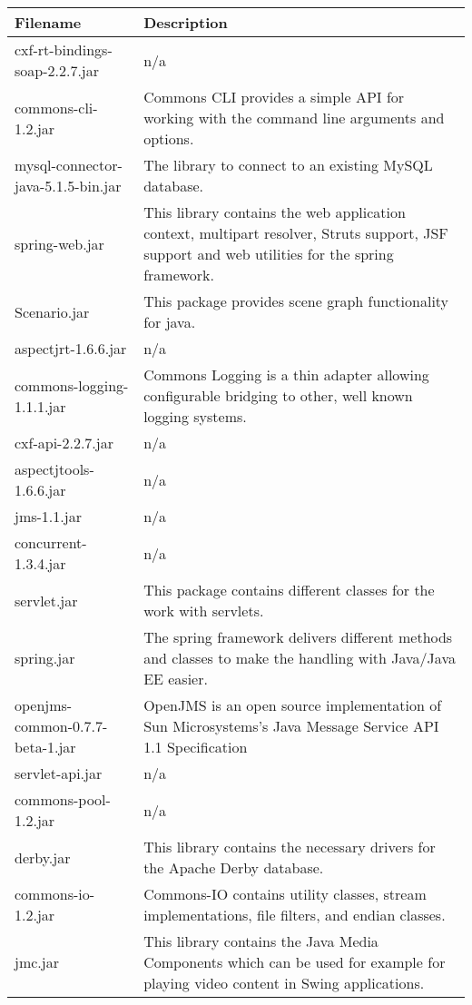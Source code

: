 \begin{center}
\begin{longtable}{|p{}|p{}|}
\hline 
Filename & Description\\
\hline
\hline 
cxf-rt-bindings-soap-2.2.7.jar & n/a\\
\hline 
commons-cli-1.2.jar & Commons CLI provides a simple API for working with the command line arguments and options.\\
\hline 
mysql-connector-java-5.1.5-bin.jar & The library to connect to an existing MySQL database.\\
\hline 
spring-web.jar & This library contains the web application context, multipart resolver, Struts support, JSF support and web utilities for the spring framework.\\
\hline 
Scenario.jar & This package provides scene graph functionality for java.\\
\hline 
aspectjrt-1.6.6.jar & n/a\\
\hline 
commons-logging-1.1.1.jar & Commons Logging is a thin adapter allowing configurable bridging to other, well known logging systems.\\
\hline 
cxf-api-2.2.7.jar & n/a\\
\hline 
aspectjtools-1.6.6.jar & n/a\\
\hline 
jms-1.1.jar & n/a\\
\hline 
concurrent-1.3.4.jar & n/a\\
\hline 
servlet.jar & This package contains different classes for the work with servlets.\\
\hline 
spring.jar & The spring framework delivers different methods and classes to make the handling with Java/Java EE easier.\\
\hline 
openjms-common-0.7.7-beta-1.jar & OpenJMS is an open source implementation of Sun Microsystems's Java Message Service API 1.1 Specification\\
\hline 
servlet-api.jar & n/a\\
\hline 
commons-pool-1.2.jar & n/a\\
\hline 
derby.jar & This library contains the necessary drivers for the Apache Derby database.\\
\hline 
commons-io-1.2.jar & Commons-IO contains utility classes, stream implementations, file filters, and endian classes.\\
\hline 
jmc.jar & This library contains the Java Media Components which can be used for example for playing video content in Swing applications.\\

\end{longtable}
\end{center}
